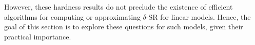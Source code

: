 


 






However, these hardness results do not preclude the existence of
efficient algorithms for computing or approximating $\delta$-SR for
linear models. Hence, the goal of this section is to explore these
questions for such models, given their practical importance.

